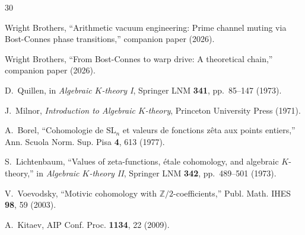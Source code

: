 \documentclass[11pt,a4paper]{article}
\begin{document}
\begin{thebibliography}{30}

Wright Brothers,
``Arithmetic vacuum engineering: Prime channel muting via
Bost-Connes phase transitions,''
companion paper (2026).

Wright Brothers,
``From Bost-Connes to warp drive: A theoretical chain,''
companion paper (2026).

D.~Quillen,
in \emph{Algebraic $K$-theory I}, Springer LNM \textbf{341},
pp.~85--147 (1973).

J.~Milnor,
\emph{Introduction to Algebraic $K$-theory},
Princeton University Press (1971).

A.~Borel,
``Cohomologie de $\mathrm{SL}_n$ et valeurs de fonctions z\^eta
aux points entiers,''
Ann. Scuola Norm. Sup. Pisa \textbf{4}, 613 (1977).

S.~Lichtenbaum,
``Values of zeta-functions, \'etale cohomology, and algebraic
$K$-theory,''
in \emph{Algebraic $K$-theory II}, Springer LNM \textbf{342},
pp.~489--501 (1973).

V.~Voevodsky,
``Motivic cohomology with $\mathbb{Z}/2$-coefficients,''
Publ. Math. IHES \textbf{98}, 59 (2003).

A.~Kitaev,
AIP Conf. Proc. \textbf{1134}, 22 (2009).

\end{thebibliography}
\end{document}
